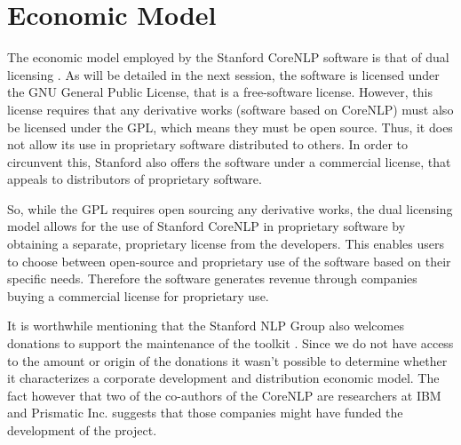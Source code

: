 \documentclass{classeENS}
\begin{document}



\section{Economic Model}\label{sec:economic model}

The economic model employed by the Stanford CoreNLP software is that of dual licensing \cite{CoreNLP}. As will be detailed in the next session, the software is licensed under the GNU General Public License, that is a free-software license. However, this license requires that any derivative works (software based on CoreNLP) must also be licensed under the GPL, which means they must be open source. Thus, it does not allow its use in proprietary software distributed to others. In order to circunvent this, Stanford also offers the software under a commercial license, that appeals to distributors of proprietary software. 

So, while the GPL requires open sourcing any derivative works, the dual licensing model allows for the use of Stanford CoreNLP in proprietary software by obtaining a separate, proprietary license from the developers. This enables users to choose between open-source and proprietary use of the software based on their specific needs. Therefore the software generates revenue through companies buying a commercial license for proprietary use.

 It is worthwhile mentioning that the Stanford NLP Group also welcomes donations to support the maintenance of the toolkit \cite{CoreNLP}. Since we do not have access to the amount or origin of the donations it wasn't possible to determine whether it characterizes a corporate development and distribution economic model. The fact however that two of the co-authors of the CoreNLP are researchers at IBM and Prismatic Inc. suggests that those companies might have funded the development of the project.
\end{document}
